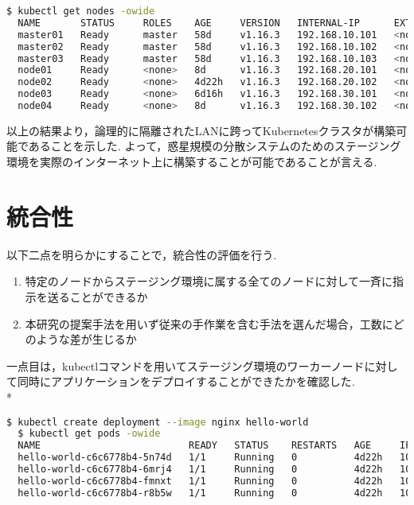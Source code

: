 \begin{lstlisting}[language=bash]
  $ kubectl get nodes -owide
  NAME       STATUS     ROLES    AGE     VERSION   INTERNAL-IP      EXTERNAL-IP   OS-IMAGE             KERNEL-VERSION      CONTAINER-RUNTIME
  master01   Ready      master   58d     v1.16.3   192.168.10.101   <none>        Ubuntu 18.04.3 LTS   4.15.0-70-generic   docker://18.9.7
  master02   Ready      master   58d     v1.16.3   192.168.10.102   <none>        Ubuntu 18.04.3 LTS   4.15.0-70-generic   docker://18.9.7
  master03   Ready      master   58d     v1.16.3   192.168.10.103   <none>        Ubuntu 18.04.3 LTS   4.15.0-70-generic   docker://18.9.7
  node01     Ready      <none>   8d      v1.16.3   192.168.20.101   <none>        Ubuntu 18.04.3 LTS   4.15.0-74-generic   docker://18.9.7
  node02     Ready      <none>   4d22h   v1.16.3   192.168.20.102   <none>        Ubuntu 18.04.3 LTS   4.15.0-74-generic   docker://18.9.7
  node03     Ready      <none>   6d16h   v1.16.3   192.168.30.101   <none>        Ubuntu 18.04.3 LTS   4.15.0-74-generic   docker://18.9.7
  node04     Ready      <none>   8d      v1.16.3   192.168.30.102   <none>        Ubuntu 18.04.3 LTS   4.15.0-74-generic   docker://18.9.7
\end{lstlisting}

以上の結果より，論理的に隔離されたLANに跨ってKubernetesクラスタが構築可能であることを示した.
よって，惑星規模の分散システムのためのステージング環境を実際のインターネット上に構築することが可能であることが言える.

\section{統合性}
\label{evaluation:method}

以下二点を明らかにすることで，統合性の評価を行う.

\begin{enumerate}
  \item 特定のノードからステージング環境に属する全てのノードに対して一斉に指示を送ることができるか
  \item 本研究の提案手法を用いず従来の手作業を含む手法を選んだ場合，工数にどのような差が生じるか
\end{enumerate}

一点目は，kubectlコマンドを用いてステージング環境のワーカーノードに対して同時にアプリケーションをデプロイすることができたかを確認した.\\*

\begin{lstlisting}[language=bash]
  $ kubectl create deployment --image nginx hello-world
  $ kubectl get pods -owide
  NAME                          READY   STATUS    RESTARTS   AGE     IP          NODE       NOMINATED NODE   READINESS GATES
  hello-world-c6c6778b4-5n74d   1/1     Running   0          4d22h   10.44.0.1   node01     <none>           <none>
  hello-world-c6c6778b4-6mrj4   1/1     Running   0          4d22h   10.42.0.1   node03     <none>           <none>
  hello-world-c6c6778b4-fmnxt   1/1     Running   0          4d22h   10.47.0.1   node02     <none>           <none>
  hello-world-c6c6778b4-r8b5w   1/1     Running   0          4d22h   10.44.0.2   node04   <none>           <none>
\end{lstlisting}


